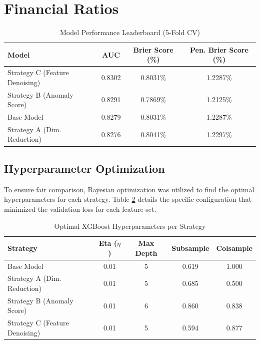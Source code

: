 \documentclass{report}\usepackage[]{graphicx}\usepackage[]{xcolor}
\begin{document}
\section{Financial Ratios}

\begin{table}[h]
    \centering
    \caption{Model Performance Leaderboard (5-Fold CV)}
    \label{tab:leaderboard}
    \begin{tabular}{lccc}
        \hline
        \textbf{Model} & \textbf{AUC} & \textbf{Brier Score (\%)} & \textbf{Pen. Brier Score (\%)} \\
        \hline
        Strategy C (Feature Denoising) & 0.8302 & 0.8031\% & 1.2287\% \\
        Strategy B (Anomaly Score) & 0.8291 & 0.7869\% & 1.2125\% \\
        Base Model & 0.8279 & 0.8031\% & 1.2287\% \\
        Strategy A (Dim. Reduction) & 0.8276 & 0.8041\% & 1.2297\% \\
        \hline
    \end{tabular}
\end{table}

\subsection{Hyperparameter Optimization}

To ensure fair comparison, Bayesian optimization was utilized to find the optimal hyperparameters for each strategy. Table \ref{tab:params} details the specific configuration that minimized the validation loss for each feature set.

\begin{table}[h]
    \centering
    \caption{Optimal XGBoost Hyperparameters per Strategy}
    \label{tab:params}
    \begin{tabular}{lcccc}
        \hline
        \textbf{Strategy} & \textbf{Eta ($\eta$)} & \textbf{Max Depth} & \textbf{Subsample} & \textbf{Colsample} \\
        \hline
        Base Model & 0.01 & 5 & 0.619 & 1.000 \\
        Strategy A (Dim. Reduction) & 0.01 & 5 & 0.685 & 0.500 \\
        Strategy B (Anomaly Score) & 0.01 & 6 & 0.860 & 0.838 \\
        Strategy C (Feature Denoising) & 0.01 & 5 & 0.594 & 0.877 \\
        \hline
    \end{tabular}
\end{table}
\end{document}
